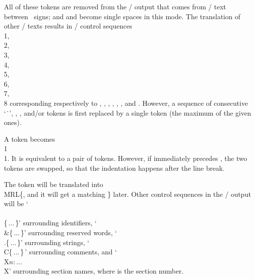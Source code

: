 \yskip\noindent All of these tokens are removed from the \TEX/ output that
comes from \CEE/ text between \pb\ signs;  and  and
 become single spaces in this mode. The translation of other
\CEE/ texts results in \TEX/ control sequences \.{\\1}, \.{\\2},
\.{\\3}, \.{\\4}, \.{\\5}, \.{\\6}, \.{\\7}, \.{\\8}
corresponding respectively to
, , , , , ,
 and .
However, a sequence of consecutive `\.\ ', ,
, and/or  tokens is first replaced by a single
token
(the maximum of the given ones).

A  token becomes \.{\\1\\1}. It is equivalent to a pair of 
tokens. However, if  immediately precedes ,
the two tokens
are swapped, so that the indentation happens after the line break.

The token  will be translated into
\.{\\MRL\{}, and it will get a matching \.\} later.
Other control sequences in the \TEX/ output will be
`\.{\\\\\{}$\,\ldots\,$\.\}'
surrounding identifiers, `\.{\\\&\{}$\,\ldots\,$\.\}' surrounding
reserved words, `\.{\\.\{}$\,\ldots\,$\.\}' surrounding strings,
`\.{\\C\{}$\,\ldots\,$\.\}$\,$' surrounding comments, and
`\.{\\X$n$:}$\,\ldots\,$\.{\\X}' surrounding section names, where
 is the section number.

